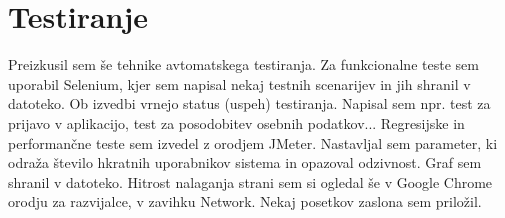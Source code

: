 \documentclass[a4paper,11pt]{article}
\begin{document}
\section{Testiranje}
Preizkusil sem še tehnike avtomatskega testiranja. Za funkcionalne teste sem uporabil Selenium, kjer sem napisal nekaj testnih scenarijev in jih shranil v datoteko. Ob izvedbi vrnejo status (uspeh) testiranja. Napisal sem npr. test za prijavo v aplikacijo, test za posodobitev osebnih podatkov...\newline
Regresijske in performančne teste sem izvedel z orodjem JMeter. Nastavljal sem parameter, ki odraža število hkratnih uporabnikov sistema in opazoval odzivnost. Graf sem shranil v datoteko. Hitrost nalaganja strani sem si ogledal še v Google Chrome orodju za razvijalce, v zavihku Network. Nekaj posetkov zaslona sem priložil.
\end{document}
